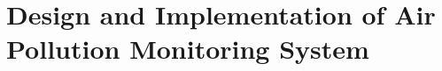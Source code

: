 \documentclass[11pt]{article}
\begin{document}
\section*{Design and Implementation of Air Pollution Monitoring System}
\end{document}
